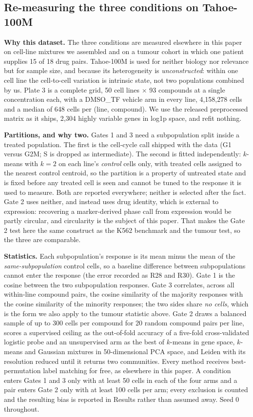\documentclass[11pt,letterpaper]{article}
\begin{document}
\subsection*{Re-measuring the three conditions on Tahoe-100M}

\textbf{Why this dataset.} The three conditions are measured elsewhere in this paper on cell-line
mixtures we assembled and on a tumour cohort in which one patient supplies 15 of 18 drug pairs.
Tahoe-100M\cite{Tahoe100M} is used for neither biology nor relevance but for sample size, and
because its heterogeneity is \emph{unconstructed}: within one cell line the cell-to-cell variation
is intrinsic state, not two populations combined by us. Plate 3 is a complete grid, 50 cell lines
$\times$ 93 compounds at a single concentration each, with a DMSO\_TF vehicle arm in every line,
4,158,278 cells and a median of 648 cells per (line, compound). We use the released preprocessed
matrix as it ships, 2,304 highly variable genes in log1p space, and refit nothing.

\textbf{Partitions, and why two.} Gates 1 and 3 need a subpopulation split inside a treated
population. The first is the cell-cycle call shipped with the data (G1 versus G2M; S is dropped as
intermediate). The second is fitted independently: $k$-means with $k = 2$ on each line's
\emph{control} cells only, with treated cells assigned to the nearest control centroid, so the
partition is a property of untreated state and is fixed before any treated cell is seen and cannot
be tuned to the response it is used to measure. Both are reported everywhere; neither is selected
after the fact. Gate 2 uses neither, and instead uses drug identity, which is external to
expression: recovering a marker-derived phase call from expression would be partly circular, and
circularity is the subject of this paper. That makes the Gate 2 test here the same construct as
the K562 benchmark and the tumour test, so the three are comparable.

\textbf{Statistics.} Each subpopulation's response is its mean minus the mean of the
\emph{same-subpopulation} control cells, so a baseline difference between subpopulations cannot
enter the response (the error recorded as R28 and R30). Gate 1 is the cosine between the two
subpopulation responses. Gate 3 correlates, across all within-line compound pairs, the cosine
similarity of the majority responses with the cosine similarity of the minority responses; the two
sides share \emph{no cells}, which is the form we also apply to the tumour statistic above. Gate 2
draws a balanced sample of up to 300 cells per compound for 20 random compound pairs per line,
scores a supervised ceiling as the out-of-fold accuracy of a five-fold cross-validated logistic
probe and an unsupervised arm as the best of $k$-means in gene space, $k$-means and Gaussian
mixtures in 50-dimensional PCA space, and Leiden with its resolution reduced until it returns two
communities. Every method receives best-permutation label matching for free, as elsewhere in this
paper. A condition enters Gates 1 and 3 only with at least 50 cells in each of the four arms and a
pair enters Gate 2 only with at least 100 cells per arm; every exclusion is counted and the
resulting bias is reported in Results rather than assumed away. Seed 0 throughout.
\end{document}
